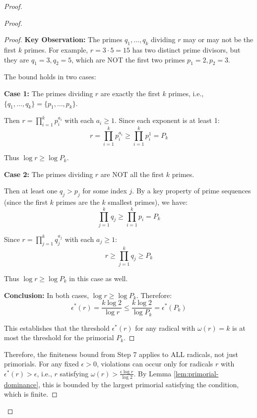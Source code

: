 \begin{proof}
\begin{proof}
\begin{proof}
\noindent\textbf{Key Observation:} The primes $q_1, \ldots, q_k$ dividing $r$ may or may not be the first $k$ primes. For example, $r = 3 \cdot 5 = 15$ has two distinct prime divisors, but they are $q_1 = 3, q_2 = 5$, which are NOT the first two primes $p_1 = 2, p_2 = 3$.

The bound holds in two cases:

\noindent\textbf{Case 1:} The primes dividing $r$ are exactly the first $k$ primes, i.e., $\{q_1, \ldots, q_k\} = \{p_1, \ldots, p_k\}$.

Then $r = \prod_{i=1}^{k} p_i^{a_i}$ with each $a_i \geq 1$. Since each exponent is at least 1:
\begin{equation}
r = \prod_{i=1}^{k} p_i^{a_i} \geq \prod_{i=1}^{k} p_i^1 = P_k
\end{equation}

Thus $\log r \geq \log P_k$.

\noindent\textbf{Case 2:} The primes dividing $r$ are NOT all the first $k$ primes.

Then at least one $q_j > p_j$ for some index $j$. By a key property of prime sequences (since the first $k$ primes are the $k$ smallest primes), we have:
\begin{equation}
\prod_{j=1}^{k} q_j \geq \prod_{i=1}^{k} p_i = P_k
\end{equation}

Since $r = \prod_{j=1}^{k} q_j^{a_j}$ with each $a_j \geq 1$:
\begin{equation}
r \geq \prod_{j=1}^{k} q_j \geq P_k
\end{equation}

Thus $\log r \geq \log P_k$ in this case as well.

\noindent\textbf{Conclusion:} In both cases, $\log r \geq \log P_k$. Therefore:
\begin{equation}
\epsilon^*(r) = \frac{k \log 2}{\log r} \leq \frac{k \log 2}{\log P_k} = \epsilon^*(P_k)
\end{equation}

This establishes that the threshold $\epsilon^*(r)$ for any radical with $\omega(r) = k$ is at most the threshold for the primorial $P_k$.

\end{proof}

Therefore, the finiteness bound from Step 7 applies to ALL radicals, not just primorials. For any fixed $\epsilon > 0$, violations can occur only for radicals $r$ with $\epsilon^*(r) > \epsilon$, i.e., $r$ satisfying $\omega(r) > \frac{\epsilon \log r}{\log 2}$. By Lemma \ref{lem:primorial-dominance}, this is bounded by the largest primorial satisfying the condition, which is finite.


\end{proof}
\end{proof}
